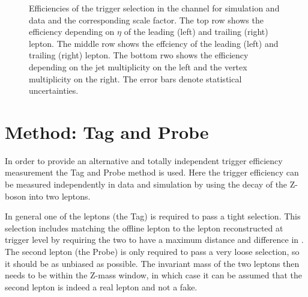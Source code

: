 \begin{figure}[htbp!]
\begin{center}
      \caption{Efficiencies of the trigger selection in the \emu channel for simulation and data and the corresponding scale factor. The top row shows the efficiency depending on $\eta$ of the leading (left) and trailing (right) lepton. The middle row shows the effciency \pt of the leading (left) and trailing (right) lepton. The bottom rwo shows the efficiency depending on the jet multiplicity on the left and the vertex multiplicity on the right.
      The error bars denote statistical uncertainties. }  
      
    \label{fig:MET_emu}
  \end{center}
\end{figure}


\section{Method: Tag and Probe}  %
\label{sec:TriggerTPMethod}

In order to provide an alternative and totally independent trigger efficiency measurement the Tag and Probe method is used.
Here the trigger efficiency can be measured independently in data and simulation by using the decay of the Z-boson into two leptons.

In general one of the leptons (the Tag) is required to pass a tight selection. This selection includes matching the offline lepton to the lepton reconstructed at trigger level by requiring the two to have a maximum distance and difference in \pt. The second lepton (the Probe) is only required to pass a very loose selection, so it should be as unbiased as possible. The invariant mass of the two leptons then needs to be within the Z-mass window, in which case it can be assumed that the second lepton is indeed a real lepton and not a fake.
